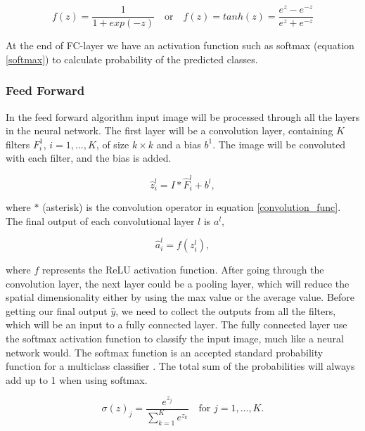\documentclass[thesis.tex]{subfiles}
\begin{document}
\begin{equation} %
  f(z) = \frac{1}{1+exp(-z)} \quad \text{or} \quad f(z) = tanh(z) = \frac{e^{z} - e^{-z}}{e^{z} + e^{-z}}
\end{equation}

At the end of FC-layer we have an activation function such as softmax (equation \ref{softmax}) to calculate probability of the predicted classes.


\subsubsection{Feed Forward}
In the feed forward algorithm input image will be processed through all the layers in the neural network. The first layer will be a convolution layer, containing $K$ filters $F_i^1$, $i= 1, ..., K$, of size $k \times k$ and a bias $b^1$. The image will be convoluted with each filter, and the bias is added. 

\begin{equation}
    \hat{z}_i^l = I * \hat{F}_i^l + b^l, 
\end{equation}

where $*$ (asterisk) is the convolution operator in equation \ref{convolution_func}. The final output of each convolutional layer $l$ is $a^l$,

\begin{equation}
    \hat{a}_i^l = f(z_i^l), 
\end{equation}

where $f$ represents the ReLU activation function. After going through the convolution layer, the next layer could be a pooling layer, which will reduce the spatial dimensionality either by using the max value or the average value.
Before getting our final output $\hat{y}$, we need to collect the outputs from all the filters, which will be an input to a fully connected layer. 
The fully connected layer use the softmax activation function to classify the input image, much like a neural network would. The softmax function is an accepted standard probability function for a multiclass classifier \cite{NotesBackpropagation16}. The total sum of the probabilities will always add up to 1 when using softmax. 

\begin{equation} %
  \sigma(z)_j = \frac{e^{z_j}}{\sum_{k=1}^{K} e^{z_k}} \quad \text{for } j = 1, ..., K.
  \label{softmax}
\end{equation}
\end{document}

